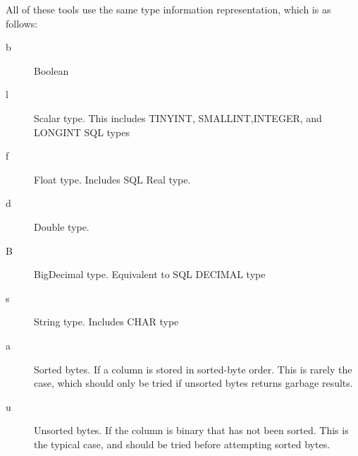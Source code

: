 \documentclass[10pt]{article}
\begin{document}
All of these tools use the same type information representation, which is as follows:

\begin{description}
\item[b] Boolean
\item[l] Scalar type. This includes TINYINT, SMALLINT,INTEGER, and LONGINT SQL types
\item[f] Float type. Includes SQL Real type.
\item[d] Double type.
\item[B] BigDecimal type. Equivalent to SQL DECIMAL type
\item[s] String type. Includes CHAR type
\item[a] Sorted bytes. If a column is stored in sorted-byte order. This is rarely the case, which should only be tried if unsorted bytes returns garbage results.
\item[u] Unsorted bytes. If the column is binary that has not been sorted. This is the typical case, and should be tried before attempting sorted bytes.
\end{description}
\end{document}
